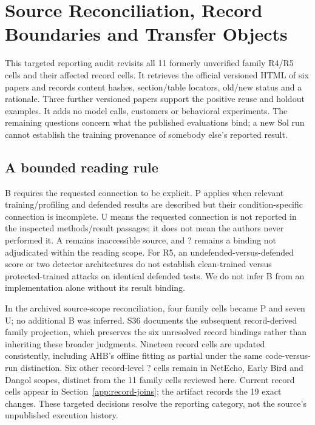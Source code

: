 \section{Source Reconciliation, Record Boundaries and Transfer Objects}\label{app:source-reconciliation}
This targeted reporting audit revisits all 11 formerly unverified family R4/R5 cells and their affected record cells. It retrieves the official versioned HTML of six papers and records content hashes, section/table locators, old/new status and a rationale. Three further versioned papers support the positive reuse and holdout examples. It adds no model calls, customers or behavioral experiments. The remaining questions concern what the published evaluations bind; a new Sol run cannot establish the training provenance of somebody else's reported result.

\subsection{A bounded reading rule}
B requires the requested connection to be explicit. P applies when relevant training/profiling and defended results are described but their condition-specific connection is incomplete. U means the requested connection is not reported in the inspected methods/result passages; it does not mean the authors never performed it. A remains inaccessible source, and ? remains a binding not adjudicated within the reading scope. For R5, an undefended-versus-defended score or two detector architectures do not establish clean-trained versus protected-trained attacks on identical defended tests. We do not infer B from an implementation alone without its result binding.



In the archived source-scope reconciliation, four family cells became P and seven U; no additional B was inferred. S36 documents the subsequent record-derived family projection, which preserves the six unresolved record bindings rather than inheriting these broader judgments. Nineteen record cells are updated consistently, including AHB's offline fitting as partial under the same code-versus-run distinction. Six other record-level ? cells remain in NetEcho, Early Bird and Dangol scopes, distinct from the 11 family cells reviewed here. Current record cells appear in Section~\ref{app:record-joins}; the artifact records the 19 exact changes. These targeted decisions resolve the reporting category, not the source's unpublished execution history.

